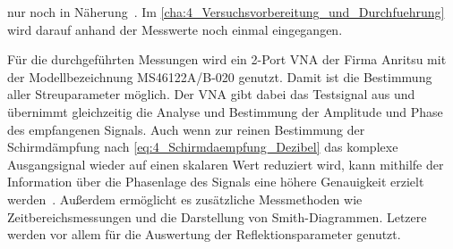 nur noch in Näherung~\cite{EM_Schirmung}. Im \Abschnitt\ref{cha:4_Versuchsvorbereitung_und_Durchfuehrung} wird darauf anhand der Messwerte noch einmal eingegangen.







Für die durchgeführten Messungen wird ein 2-Port VNA der Firma Anritsu mit der Modellbezeichnung MS46122A/B-020 genutzt. Damit ist die Bestimmung aller Streuparameter möglich. Der VNA gibt dabei das Testsignal aus und übernimmt gleichzeitig die Analyse und Bestimmung der Amplitude und Phase des empfangenen Signals. Auch wenn zur reinen Bestimmung der Schirmdämpfung nach \Gleichung\eqref{eq:4_Schirmdaempfung_Dezibel} das komplexe Ausgangsignal wieder auf einen skalaren Wert reduziert wird, kann mithilfe der Information über die Phasenlage des Signals eine höhere Genauigkeit erzielt werden~\cite{VNA-Handbuch}. Außerdem ermöglicht es zusätzliche Messmethoden wie Zeitbereichsmessungen und die Darstellung von Smith-Diagrammen. Letzere werden vor allem für die Auswertung der Reflektionsparameter genutzt.




